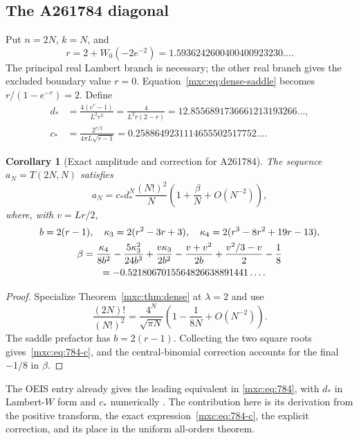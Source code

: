 \documentclass[11pt]{article}
\numberwithin{equation}{section}
\newtheorem{corollary}[theorem]{Corollary}
\theoremstyle{definition}
\theoremstyle{remark}
\begin{document}
\subsection{The A261784 diagonal}\label{mxc:sec:784}
Put $n=2N$, $k=N$, and
\begin{equation}\label{mxc:eq:784-r}
 r=2+W_0(-2e^{-2})=1.5936242600400400923230\ldots.
\end{equation}
The principal real Lambert branch is necessary; the other real branch
gives the excluded boundary value $r=0$. Equation~\eqref{mxc:eq:dense-saddle}
becomes $r/(1-e^{-r})=2$. Define
\begin{align}
 d_*&=\frac{4(e^r-1)}{L^2r^2}
       =\frac4{L^2r(2-r)}
       =12.8556891736661213193266\ldots,\label{mxc:eq:784-d}\\
 c_*&=\frac{2^{r/2}}{4\pi L\sqrt{r-1}}
       =0.2588649231114655502517752\ldots.\label{mxc:eq:784-c}
\end{align}

\begin{corollary}[Exact amplitude and correction for A261784]\label{mxc:cor:784}
The sequence $a_N=T(2N,N)$ satisfies
\begin{equation}\label{mxc:eq:784}
 \boxed{\displaystyle
 a_N=c_*d_*^N\frac{(N!)^2}{N}
       \left(1+\frac{\beta}{N}+O(N^{-2})\right),}
\end{equation}
where, with $v=Lr/2$,
\begin{gather*}
 b=2(r-1),\quad
 \kappa_3=2(r^2-3r+3),\quad
 \kappa_4=2(r^3-8r^2+19r-13),\\
 \beta=\frac{\kappa_4}{8b^2}-\frac{5\kappa_3^2}{24b^3}
       +\frac{v\kappa_3}{2b^2}-\frac{v+v^2}{2b}
       +\frac{v^2/3-v}{2}-\frac18\\
 \hphantom{\beta}=-0.5218067015564826638891441\ldots.
\end{gather*}
\end{corollary}
\begin{proof}
Specialize Theorem~\ref{mxc:thm:dense} at $\lambda=2$ and use
\[
 \frac{(2N)!}{(N!)^2}=\frac{4^N}{\sqrt{\pi N}}
                         \left(1-\frac1{8N}+O(N^{-2})\right).
\]
The saddle prefactor has $b=2(r-1)$. Collecting the two square roots
gives~\eqref{mxc:eq:784-c}, and the central-binomial correction accounts
for the final $-1/8$ in $\beta$.
\end{proof}

The OEIS entry already gives the leading equivalent in
\eqref{mxc:eq:784}, with $d_*$ in Lambert-$W$ form and $c_*$ numerically
\cite{oeis784}. The contribution here is its derivation from the
positive transform, the exact expression~\eqref{mxc:eq:784-c}, the
explicit correction, and its place in the uniform all-orders theorem.
\end{document}
